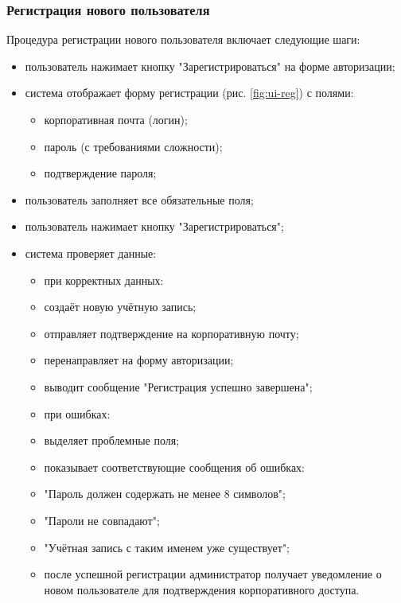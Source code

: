 \subsubsection{Регистрация нового пользователя}  
Процедура регистрации нового пользователя включает следующие шаги:  
\begin{itemize}  
	\item пользователь нажимает кнопку "Зарегистрироваться" на форме авторизации;  
	\item система отображает форму регистрации (рис. \ref{fig:ui-reg}) с полями:  
	\begin{itemize}  
		\item корпоративная почта (логин);  
		\item пароль (с требованиями сложности);  
		\item подтверждение пароля;  
	\end{itemize}  
	\item пользователь заполняет все обязательные поля;  
	\item пользователь нажимает кнопку "Зарегистрироваться";  
	\item система проверяет данные:  
	\begin{itemize}  
		\item при корректных данных:   
			\item создаёт новую учётную запись;  
			\item отправляет подтверждение на корпоративную почту;  
			\item перенаправляет на форму авторизации;  
			\item выводит сообщение "Регистрация успешно завершена";   
		\item при ошибках:  
			\item выделяет проблемные поля;  
			\item показывает соответствующие сообщения об ошибках:  
				\item "Пароль должен содержать не менее 8 символов";  
				\item "Пароли не совпадают";  
				\item "Учётная запись с таким именем уже существует";   
	\item после успешной регистрации администратор получает уведомление о новом пользователе для подтверждения корпоративного доступа.  
\end{itemize}  


\end{itemize}
